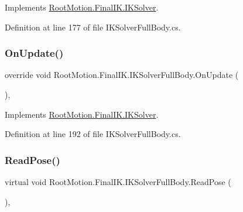 Implements \mbox{\hyperlink{class_root_motion_1_1_final_i_k_1_1_i_k_solver_a2a8cbf1dfed274fdbc79ff011c468cc6}{Root\+Motion.\+Final\+I\+K.\+I\+K\+Solver}}.



Definition at line 177 of file I\+K\+Solver\+Full\+Body.\+cs.

\mbox{\label{class_root_motion_1_1_final_i_k_1_1_i_k_solver_full_body_a465b375253ab446e5f3ae14614290174}} 
\subsubsection{\texorpdfstring{On\+Update()}{OnUpdate()}}
{\footnotesize\ttfamily override void Root\+Motion.\+Final\+I\+K.\+I\+K\+Solver\+Full\+Body.\+On\+Update (\begin{DoxyParamCaption}{ }\end{DoxyParamCaption})\hspace{0.3cm}{\ttfamily [protected]}, {\ttfamily [virtual]}}



Implements \mbox{\hyperlink{class_root_motion_1_1_final_i_k_1_1_i_k_solver_a3bbcc10c91d82ac266dadc63ea93171d}{Root\+Motion.\+Final\+I\+K.\+I\+K\+Solver}}.



Definition at line 192 of file I\+K\+Solver\+Full\+Body.\+cs.

\mbox{\label{class_root_motion_1_1_final_i_k_1_1_i_k_solver_full_body_abee6485084ea3120e974145609fe7838}} 
\subsubsection{\texorpdfstring{Read\+Pose()}{ReadPose()}}
{\footnotesize\ttfamily virtual void Root\+Motion.\+Final\+I\+K.\+I\+K\+Solver\+Full\+Body.\+Read\+Pose (\begin{DoxyParamCaption}{ }\end{DoxyParamCaption})\hspace{0.3cm}{\ttfamily [protected]}, {\ttfamily [virtual]}}



